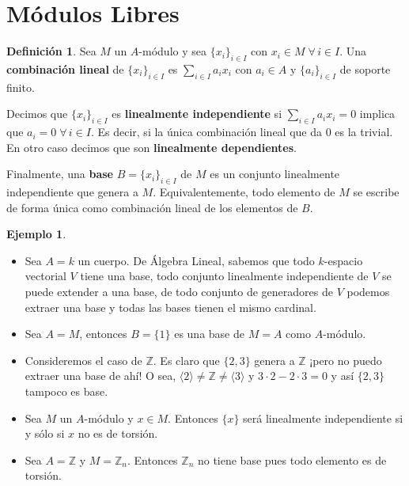 \documentclass[12pt]{book}
\theoremstyle{definition}
\newtheorem{defn}[teo]{Definición}
\newtheorem{ex}[teo]{Ejemplo}
\newcommand{\ZZ}{\mathbb{Z}}      %
\begin{document}
\section{Módulos Libres}

\begin{defn}
Sea $M$ un $A$-módulo y sea $\{x_i\}_{i\in I}$ con $x_i\in M \; \forall \, i\in I$. Una \textbf{combinación lineal} de $\{x_i\}_{i\in I}$ es $\displaystyle\sum_{i\in I} a_i x_i$ con $a_i\in A$ y $\{a_i\}_{i\in I}$ de soporte finito.

Decimos que $\{x_i\}_{i\in I}$ es \textbf{linealmente independiente} si $\displaystyle\sum_{i\in I}a_ix_i = 0$ implica que $a_i=0\;\forall\, i\in I$. Es decir, si la única combinación lineal que da $0$ es la trivial. En otro caso decimos que son \textbf{linealmente dependientes}.

Finalmente, una \textbf{base} $B=\{x_i\}_{i\in I}$ de $M$ es un conjunto linealmente independiente que genera a $M$. Equivalentemente, todo elemento de $M$ se escribe de forma única como combinación lineal de los elementos de $B$.
\end{defn}

\begin{ex}
\begin{itemize}
\item Sea $A=k$ un cuerpo. De Álgebra Lineal, sabemos que todo $k$-espacio vectorial $V$ tiene una base, todo conjunto linealmente independiente de $V$ se puede extender a una base, de todo conjunto de generadores de $V$ podemos extraer una base y todas las bases tienen el mismo cardinal.

\item Sea $A=M$, entonces $B=\{1\}$ es una base de $M=A$ como $A$-módulo.

\item Consideremos el caso de $\ZZ$. Es claro que $\{2,3\}$ genera a $\ZZ$ ¡pero no puedo extraer una base de ahí! O sea, $\langle 2\rangle \neq \ZZ \neq \langle 3\rangle$ y $3\cdot 2 - 2\cdot 3 = 0$ y así $\{2,3\}$ tampoco es base.

\item Sea $M$ un $A$-módulo y $x\in M$. Entonces $\{x\}$ será linealmente independiente si y sólo si $x$ no es de torsión.

\item Sea $A=\ZZ$ y $M=\ZZ_n$. Entonces $\ZZ_n$ no tiene base pues todo elemento es de torsión.
\end{itemize}
\end{ex}
\end{document}
